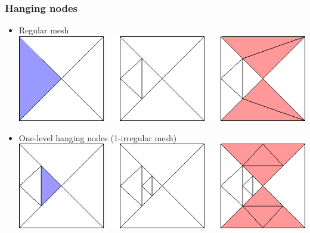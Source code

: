 \begin{frame}
  \frametitle{Hanging nodes}
  \begin{itemize}
    \item Regular mesh\\[2mm]    
    \includegraphics[height=0.3\textheight]{regular_c}
    \item One-level hanging nodes (1-irregular mesh)\\[2mm]
    \includegraphics[height=0.3\textheight]{one_irr_c}
  \end{itemize}
\end{frame} 
